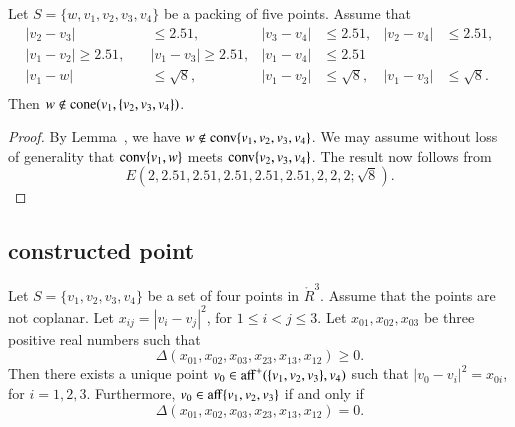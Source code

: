 \begin{tarskidata}
\begin{tarski}
\begin{lemma}
Let $S=\{w,v_1,v_2,v_3,v_4\}$ be a packing of five points.
Assume that
  $$
  \begin{array}{rlrlrlrlrllll}
  |v_2-v_3|&\le 2.51,& |v_3-v_4|&\le 2.51,  &|v_2-v_4|&\le 2.51,\\
  |v_1-v_2|\ge 2.51,\quad &|v_1-v_3|\ge 2.51,&|v_1-v_4|&\le 2.51\\
  |v_1-w|&\le \sqrt8,&|v_1-v_2|&\le \sqrt8,&|v_1-v_3|&\le\sqrt8.\\
  \end{array}
$$
Then $w\not\in {\operatorname{cone}}(v_1,\{v_2,v_3,v_4\})$.
\end{lemma}

\begin{proof}
By Lemma~, we have $w\not\in{\operatorname{conv}}\{v_1,v_2,v_3,v_4\}$.
We may assume without loss of generality that
${\operatorname{conv}}\{v_1,w\}$ meets ${\operatorname{conv}}\{v_2,v_3,v_4\}$.  The result
now follows from
    $$
    E(2,2.51,2.51,2.51,2.51,2.51,2,2,2;  \sqrt{8}).
    $$
\end{proof}
\end{tarski}







\begin{tarski}
\subsection{constructed point}

\begin{lemma}
Let $S=\{v_1,v_2,v_3,v_4\}$ be a set of four points
in $\ring{R}^3$.  Assume that the points are not coplanar.
Let $x_{ij} = |v_i-v_j|^2$, for $1\le i < j\le 3$.
Let $x_{01},x_{02},x_{03}$ be three positive real numbers such that
$$
  \Delta(x_{01},x_{02},x_{03},x_{23},x_{13},x_{12})\ge0.
$$
Then there exists a unique point $v_0\in{\operatorname{aff}}^+(\{v_1,v_2,v_3\},v_4)$
such that
   $|v_0-v_i|^2 = x_{0i}$, for $i=1,2,3$.
Furthermore, $v_0\in{\operatorname{aff}}\{v_1,v_2,v_3\}$ if and only if 
 $$
  \Delta(x_{01},x_{02},x_{03},x_{23},x_{13},x_{12})=0.
$$
\end{lemma}


\end{tarski}
\end{tarskidata}

